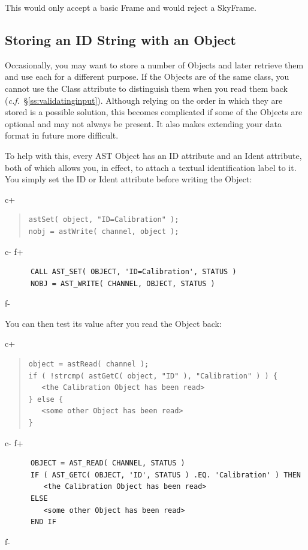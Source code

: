 \documentclass[twoside,11pt]{article}
\newcommand{\secref}[1]{\S\ref{#1}}
\newcommand{\secref}[1]{\ref{#1}}
\begin{document}
This would only accept a basic Frame and would reject a SkyFrame.

\subsection{Storing an ID String with an Object}

Occasionally, you may want to store a number of Objects and later
retrieve them and use each for a different purpose. If the Objects are
of the same class, you cannot use the Class attribute to distinguish
them when you read them back
({\em{c.f.}}~\secref{ss:validatinginput}). Although relying on the
order in which they are stored is a possible solution, this becomes
complicated if some of the Objects are optional and may not always be
present. It also makes extending your data format in future more
difficult.

To help with this, every AST Object has an ID attribute and an Ident
attribute, both of which allows you, in effect, to attach a textual
identification label to it. You simply set the ID or Ident attribute before
writing the Object:

c+
\begin{quote}
\small
\begin{verbatim}
astSet( object, "ID=Calibration" );
nobj = astWrite( channel, object );
\end{verbatim}
\normalsize
\end{quote}
c-
f+
\small
\begin{verbatim}
      CALL AST_SET( OBJECT, 'ID=Calibration', STATUS )
      NOBJ = AST_WRITE( CHANNEL, OBJECT, STATUS )
\end{verbatim}
\normalsize
f-

You can then test its value after you read the Object back:

c+
\begin{quote}
\small
\begin{verbatim}
object = astRead( channel );
if ( !strcmp( astGetC( object, "ID" ), "Calibration" ) ) {
   <the Calibration Object has been read>
} else {
   <some other Object has been read>
}
\end{verbatim}
\normalsize
\end{quote}
c-
f+
\small
\begin{verbatim}
      OBJECT = AST_READ( CHANNEL, STATUS )
      IF ( AST_GETC( OBJECT, 'ID', STATUS ) .EQ. 'Calibration' ) THEN
         <the Calibration Object has been read>
      ELSE
         <some other Object has been read>
      END IF
\end{verbatim}
\normalsize
f-
\end{document}
